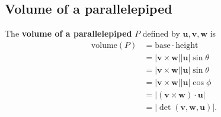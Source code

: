 \subsection{Volume of a parallelepiped}

\begin{definition}
    The \textbf{volume of a parallelepiped} $P$ defined by $\bm u,\bm v,\bm w$ is
    \begin{align*}
        \text{volume}(P)&=\text{base}\cdot\text{height}\\
        &=|\bm v\times\bm w||\bm u|\sin{\theta}\\
        &=|\bm v\times\bm w||\bm u|\sin{\theta}\\
        &=|\bm v\times\bm w||\bm u|\cos{\phi}\\
        &=|(\bm v\times\bm w)\cdot\bm u|\\
        &=|\det{(\bm v,\bm w,\bm u)}|.\\
    \end{align*}
\end{definition}

